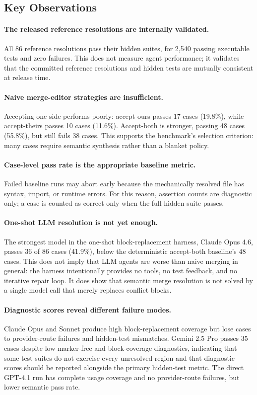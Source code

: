 \documentclass[11pt,letterpaper]{article}
\begin{document}
\subsection{Key Observations}

\paragraph{The released reference resolutions are internally validated.} All 86 reference resolutions pass their hidden suites, for 2{,}540 passing executable tests and zero failures. This does not measure agent performance; it validates that the committed reference resolutions and hidden tests are mutually consistent at release time.

\paragraph{Naive merge-editor strategies are insufficient.} Accepting one side performs poorly: accept-ours passes 17 cases (19.8\%), while accept-theirs passes 10 cases (11.6\%). Accept-both is stronger, passing 48 cases (55.8\%), but still fails 38 cases. This supports the benchmark's selection criterion: many cases require semantic synthesis rather than a blanket policy.

\paragraph{Case-level pass rate is the appropriate baseline metric.} Failed baseline runs may abort early because the mechanically resolved file has syntax, import, or runtime errors. For this reason, assertion counts are diagnostic only; a case is counted as correct only when the full hidden suite passes.

\paragraph{One-shot LLM resolution is not yet enough.} The strongest model in the one-shot block-replacement harness, Claude Opus 4.6, passes 36 of 86 cases (41.9\%), below the deterministic accept-both baseline's 48 cases. This does not imply that LLM agents are worse than naive merging in general: the harness intentionally provides no tools, no test feedback, and no iterative repair loop. It does show that semantic merge resolution is not solved by a single model call that merely replaces conflict blocks.

\paragraph{Diagnostic scores reveal different failure modes.} Claude Opus and Sonnet produce high block-replacement coverage but lose cases to provider-route failures and hidden-test mismatches. Gemini 2.5 Pro passes 35 cases despite low marker-free and block-coverage diagnostics, indicating that some test suites do not exercise every unresolved region and that diagnostic scores should be reported alongside the primary hidden-test metric. The direct GPT-4.1 run has complete usage coverage and no provider-route failures, but lower semantic pass rate.
\end{document}
